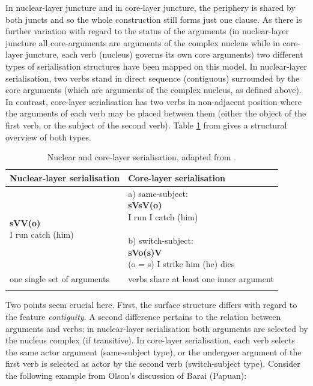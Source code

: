 In nuclear-layer juncture and in core-layer juncture, the periphery is shared by both juncts and so the whole construction still forms just one clause. As there is further variation with regard to the status of the arguments (in nuclear-layer juncture all core-arguments are arguments of the complex nucleus while in core-layer juncture, each verb (nucleus) governs its own core arguments) two different types of serialisation structures have been mapped on this model. In nuclear-layer serialisation, two verbs stand in direct sequence (contiguous) surrounded by the core arguments (which are arguments of the complex nucleus, as defined above). In contrast, core-layer serialisation has two verbs in non-adjacent position where the arguments of each verb may be placed between them (either the object of the first verb, or the subject of the second verb). Table \ref{tab:nuc-core} from \citet{bril2004complex} gives a structural overview of both types.

\begin{table}
\begin{tabular}{ll}
\lsptoprule 
Nuclear-layer serialisation & Core-layer serialisation \\
\midrule 
\pbox[c]{0.5\textwidth}{\textbf{sVV(o)} \\
 I run catch (him) } & 
 \pbox[c]{0.5\textwidth}{ a) same-subject: \\ \textbf{sVsV(o)} \\
 I run I catch (him) \\  \\
 b) switch-subject: \\ \textbf{sVo(s)V} \\ 
 (o = s) I strike him (he) dies }  \\
\midrule
one single set of arguments & verbs share at least one inner argument \\
\lspbottomrule
\end{tabular}
\caption[Nuclear-layer and core-layer serialisation]{Nuclear and core-layer serialisation, adapted from \citet[4]{bril2004complex}.} \label{tab:nuc-core}
\end{table}

Two points seem crucial here. First, the surface structure differs with regard to the feature \textit{contiguity}. A second difference pertains to the relation between arguments and verbs: in nuclear-layer serialisation both arguments are selected by the nucleus complex (if transitive). In core-layer serialisation, each verb selects the same actor argument (same-subject type), or the undergoer argument of the first verb is selected as actor by the second verb (switch-subject type). Consider the following example from Olson's \citep{olson1981barai} discussion of Barai (Papuan):


